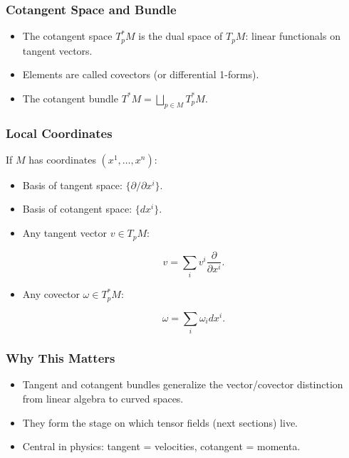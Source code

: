 \documentclass[
  letterpaper,
  DIV=11,
  numbers=noendperiod]{scrreprt}
\providecommand{\tightlist}{%
  \setlength{\itemsep}{0pt}\setlength{\parskip}{0pt}}
\begin{document}
\subsubsection{Cotangent Space and
Bundle}\label{cotangent-space-and-bundle}

\begin{itemize}
\tightlist
\item
  The cotangent space \(T^*_p M\) is the dual space of \(T_p M\): linear
  functionals on tangent vectors.
\item
  Elements are called covectors (or differential 1-forms).
\item
  The cotangent bundle \(T^*M = \bigsqcup_{p \in M} T^*_p M\).
\end{itemize}

\subsubsection{Local Coordinates}\label{local-coordinates}

If \(M\) has coordinates \((x^1, \dots, x^n)\):

\begin{itemize}
\item
  Basis of tangent space: \(\{\partial/\partial x^i\}\).
\item
  Basis of cotangent space: \(\{dx^i\}\).
\item
  Any tangent vector \(v \in T_p M\):

  \[
  v = \sum_i v^i \frac{\partial}{\partial x^i}.
  \]
\item
  Any covector \(\omega \in T^*_p M\):

  \[
  \omega = \sum_i \omega_i dx^i.
  \]
\end{itemize}

\subsubsection{Why This Matters}\label{why-this-matters-55}

\begin{itemize}
\tightlist
\item
  Tangent and cotangent bundles generalize the vector/covector
  distinction from linear algebra to curved spaces.
\item
  They form the stage on which tensor fields (next sections) live.
\item
  Central in physics: tangent = velocities, cotangent = momenta.
\end{itemize}
\end{document}
